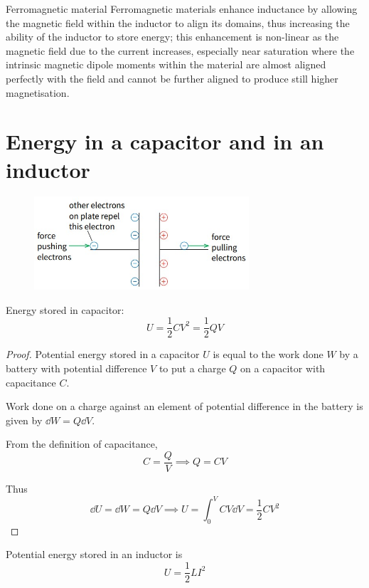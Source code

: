 \begin{defn}{Ferromagnetic material}{}
Ferromagnetic materials enhance inductance by allowing the magnetic field within the inductor to align its domains, thus increasing the ability of the inductor to store energy; this enhancement is non-linear as the magnetic field due to the current increases, especially near saturation where the intrinsic magnetic dipole moments within the material are almost aligned perfectly with the field and cannot be further aligned to produce still higher magnetisation.
\end{defn}

\section{Energy in a capacitor and in an inductor}
\begin{figure}[H]
    \centering
    \includegraphics[width=8cm]{images/capacitor_energy.jpg}
\end{figure}

Energy stored in capacitor:
\begin{equation}
{U = \frac{1}{2}CV^2 = \frac{1}{2}QV
}\end{equation}

\begin{proof}
Potential energy stored in a capacitor $U$ is equal to the work done $W$ by a battery with potential difference $V$ to put a charge $Q$ on a capacitor with capacitance $C$.

Work done on a charge against an element of potential difference in the battery is given by $\dd{W} = Q \dd{V}$.

From the definition of capacitance, 
\[ C = \frac{Q}{V} \implies Q = CV \]

Thus 
\[ \dd{U} = \dd{W} = Q \dd{V} \implies U = \int_0^V CV \dd{V} = \frac{1}{2}CV^2 \]
\end{proof}

Potential energy stored in an inductor is 
\begin{equation}
{U = \frac{1}{2}LI^2
}\end{equation}

